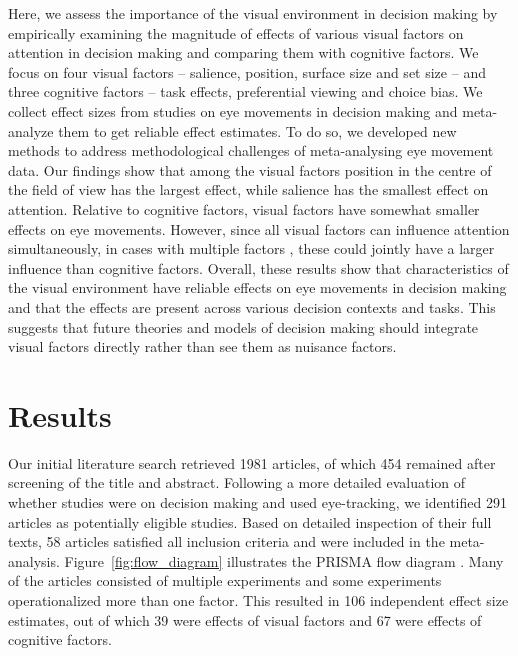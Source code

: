 \documentclass[english,natbib,man,floatsintext]{apa6}
\begin{document}
Here, we assess the importance of the visual environment in decision making by empirically examining the magnitude of effects of various visual factors on attention in decision making and comparing them with cognitive factors. We focus on four visual factors -- salience, position, surface size and set size -- and three cognitive factors -- task effects, preferential viewing and choice bias. We collect effect sizes from studies on eye movements in decision making and meta-analyze them to get reliable effect estimates. To do so, we developed new methods to address methodological challenges of meta-analysing eye movement data. Our findings show that among the visual factors position in the centre of the field of view has the largest effect, while salience has the smallest effect on attention. Relative to cognitive factors, visual factors have somewhat smaller effects on eye movements.  However, since all visual factors can influence attention simultaneously, in cases with multiple factors \citep{gidloef2017a, orquin2019a}, these could jointly have a larger influence than cognitive factors. Overall, these results show that characteristics of the visual environment have reliable effects on eye movements in decision making and that the effects are present across various decision contexts and tasks. This suggests that future theories and models of decision making should integrate visual factors directly rather than see them as nuisance factors.



\section{Results}

Our initial literature search retrieved 1981 articles, of which 454 remained after screening of the title and abstract. Following a more detailed evaluation of whether studies were on decision making and used eye-tracking, we identified 291 articles as potentially eligible studies. Based on detailed inspection of their full texts, 58 articles satisfied all inclusion criteria and were included in the meta-analysis. Figure~\ref{fig:flow_diagram} illustrates the PRISMA flow diagram \citep{moher2009preferred}. Many of the articles consisted of multiple experiments and some experiments operationalized more than one factor. This resulted in 106 independent effect size estimates, out of which 39 were effects of visual factors and 67 were effects of cognitive factors.
\end{document}
